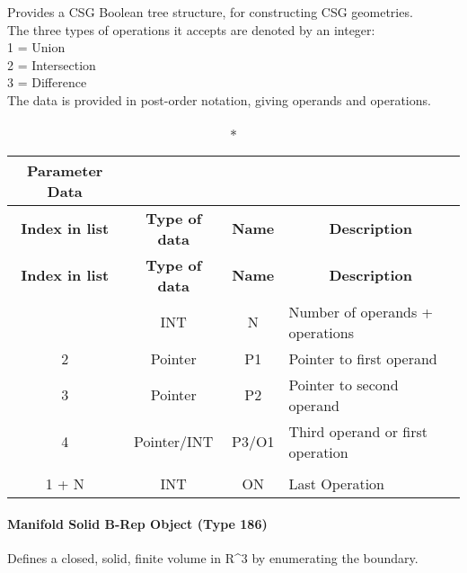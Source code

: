 Provides a CSG Boolean tree structure, for constructing CSG
geometries.\\The three types of operations it accepts are denoted by an
integer:\\1 = Union\\2 = Intersection\\3 = Difference\\The data is
provided in post-order notation, giving operands and operations.

\begin{longtable}[H]{|c|c|c|l|}
  \caption*{Parameter Data} \\

  \hline
  \multicolumn{1}{|c|}{\textbf{Index in list}} & \multicolumn{1}{|c|}{\textbf{Type of data}} &
  \multicolumn{1}{|c|}{\textbf{Name}} & \multicolumn{1}{|c|}{\textbf{Description}} \\ \hline
  \endfirsthead
  \hline
  
  \multicolumn{1}{|c|}{\textbf{Index in list}} & \multicolumn{1}{|c|}{\textbf{Type of data}} &
  \multicolumn{1}{|c|}{\textbf{Name}} & \multicolumn{1}{|c|}{\textbf{Description}} \\ \hline
  \endhead
  
  \endfoot

  \endlastfoot
1 & INT & N & Number of operands + operations\\ \hline
2 & Pointer & P1 & Pointer to first operand\\ \hline
3 & Pointer & P2 & Pointer to second operand\\ \hline
4 & Pointer/INT & P3/O1 & Third operand or first
operation\\ \hline
\vtop{\hbox{\strut .}\hbox{\strut .}} &
\vtop{\hbox{\strut .}\hbox{\strut .}} &
\vtop{\hbox{\strut .}\hbox{\strut .}} &\\ \hline
1 + N & INT & ON & Last Operation\\ \hline
\end{longtable}

\paragraph{Manifold Solid B-Rep Object (Type
186)}\label{manifold-solid-b-rep-object-type-186}

Defines a closed, solid, finite volume in R\^{}3 by enumerating the
boundary.

